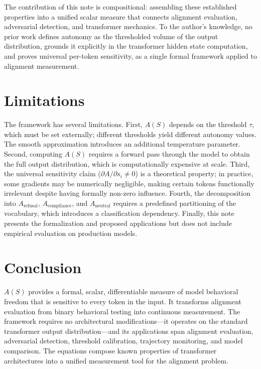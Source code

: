 \documentclass[11pt,letterpaper]{article}
\begin{document}
The contribution of this note is compositional: assembling these established properties into a unified scalar measure that connects alignment evaluation, adversarial detection, and transformer mechanics. To the author's knowledge, no prior work defines autonomy as the thresholded volume of the output distribution, grounds it explicitly in the transformer hidden state computation, and proves universal per-token sensitivity, as a single formal framework applied to alignment measurement.

\section{Limitations}
The framework has several limitations. First, $A(S)$ depends on the threshold $\tau$, which must be set externally; different thresholds yield different autonomy values. The smooth approximation introduces an additional temperature parameter. Second, computing $A(S)$ requires a forward pass through the model to obtain the full output distribution, which is computationally expensive at scale. Third, the universal sensitivity claim ($\partial A/\partial s_i\neq 0$) is a theoretical property; in practice, some gradients may be numerically negligible, making certain tokens functionally irrelevant despite having formally non-zero influence. Fourth, the decomposition into $A_{\mathrm{refusal}}$, $A_{\mathrm{compliance}}$, and $A_{\mathrm{neutral}}$ requires a predefined partitioning of the vocabulary, which introduces a classification dependency. Finally, this note presents the formalization and proposed applications but does not include empirical evaluation on production models.

\section{Conclusion}
$A(S)$ provides a formal, scalar, differentiable measure of model behavioral freedom that is sensitive to every token in the input. It transforms alignment evaluation from binary behavioral testing into continuous measurement. The framework requires no architectural modifications---it operates on the standard transformer output distribution---and its applications span alignment evaluation, adversarial detection, threshold calibration, trajectory monitoring, and model comparison. The equations compose known properties of transformer architectures into a unified measurement tool for the alignment problem.
\end{document}
